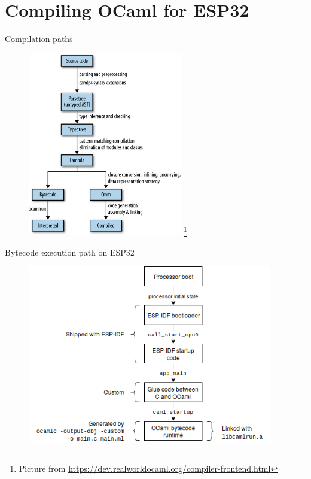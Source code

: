 \documentclass[10pt]{beamer}
\begin{document}
\section{Compiling OCaml for ESP32}

\begin{frame}{Compilation paths}
\begin{figure}
\centering
\includegraphics[width=0.6\textwidth]{pipeline}
\let\thefootnote\relax\footnote{Picture from \url{https://dev.realworldocaml.org/compiler-frontend.html}}
\end{figure}
\end{frame}

\begin{frame}{Bytecode execution path on ESP32}
\begin{figure}
\includegraphics[width=0.95\textwidth]{Bytecode_comp}
\end{figure}
\end{frame}
\end{document}
